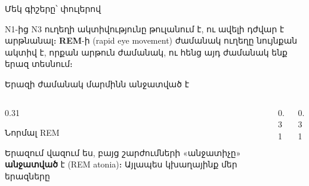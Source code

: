\begin{frame}{Մեկ գիշերը՝ փուլերով}
  \centering
  \par\medskip
  {\small N1-ից N3 ուղեղի ակտիվությունը թուլանում է, ու ավելի դժվար է արթնանալ։ \textbf{REM}-ի (rapid eye movement) ժամանակ ուղեղը նույնքան ակտիվ է, որքան արթուն ժամանակ, ու հենց այդ ժամանակ ենք երազ տեսնում։}
\end{frame}

\begin{frame}{Երազի ժամանակ մարմինն անջատված է}
  \begin{columns}[T]
    \begin{column}{0.31\textwidth}
      \begin{card}[colback=mint!30!cardwhite]
        \centering{}\par
        {\blackfont Նորմալ REM}\par\smallskip
        \raggedright Երազում վազում ես, բայց շարժումների «անջատիչը» \textbf{անջատված} է (REM atonia)։ Այլապես կխաղայինք մեր երազները
      \end{card}
    \end{column}
    \begin{column}{0.31\textwidth}
    \end{column}
    \begin{column}{0.31\textwidth}
    \end{column}
  \end{columns}
\end{frame}

